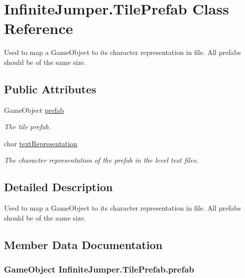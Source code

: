 \hypertarget{class_infinite_jumper_1_1_tile_prefab}{}\section{Infinite\+Jumper.\+Tile\+Prefab Class Reference}
\label{class_infinite_jumper_1_1_tile_prefab}


Used to map a Game\+Object to its character representation in file. All prefabs should be of the same size.  


\subsection*{Public Attributes}
\begin{DoxyCompactItemize}
\item 
Game\+Object \hyperlink{class_infinite_jumper_1_1_tile_prefab_a8efe75144b674a8062dc8f7dbe3c6b9d}{prefab}
\begin{DoxyCompactList}\small\item\em The tile prefab. \end{DoxyCompactList}\item 
char \hyperlink{class_infinite_jumper_1_1_tile_prefab_a88b18d3369e581a740d48e071c9f4790}{text\+Representation}
\begin{DoxyCompactList}\small\item\em The character representation of the prefab in the level text files. \end{DoxyCompactList}\end{DoxyCompactItemize}


\subsection{Detailed Description}
Used to map a Game\+Object to its character representation in file. All prefabs should be of the same size. 



\subsection{Member Data Documentation}
\hypertarget{class_infinite_jumper_1_1_tile_prefab_a8efe75144b674a8062dc8f7dbe3c6b9d}{}
\subsubsection[{prefab}]{\setlength{\rightskip}{0pt plus 5cm}Game\+Object Infinite\+Jumper.\+Tile\+Prefab.\+prefab}\label{class_infinite_jumper_1_1_tile_prefab_a8efe75144b674a8062dc8f7dbe3c6b9d}


